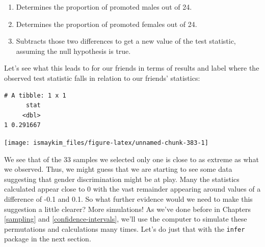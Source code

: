 \documentclass[12pt, krantz2,]{krantz}
\makeatletter
\newenvironment{Shaded}{\begin{snugshade}}{\end{snugshade}}
\newcommand{\DataTypeTok}[1]{\textcolor[rgb]{0.27,0.27,0.27}{#1}}
\newcommand{\KeywordTok}[1]{\textcolor[rgb]{0.27,0.27,0.27}{\textbf{#1}}}
\newcommand{\NormalTok}[1]{#1}
\newcommand{\OperatorTok}[1]{\textcolor[rgb]{0.43,0.43,0.43}{\textbf{#1}}}
\newcommand{\StringTok}[1]{\textcolor[rgb]{0.5,0.5,0.5}{#1}}
\providecommand{\tightlist}{%
  \setlength{\itemsep}{0pt}\setlength{\parskip}{0pt}}
\newenvironment{kframe}{%
\medskip{}
\setlength{\fboxsep}{.8em}
 \def\at@end@of@kframe{}%
 \ifinner\ifhmode%
  \def\at@end@of@kframe{\end{minipage}}%
  \begin{minipage}{\columnwidth}%
 \fi\fi%
 \def\FrameCommand##1{\hskip\@totalleftmargin \hskip-\fboxsep
 \colorbox{shadecolor}{##1}\hskip-\fboxsep
     \hskip-\linewidth \hskip-\@totalleftmargin \hskip\columnwidth}%
 \MakeFramed {\advance\hsize-\width
   \@totalleftmargin\z@ \linewidth\hsize
   \@setminipage}}%
 {\par\unskip\endMakeFramed%
 \at@end@of@kframe}
\renewenvironment{Shaded}{\begin{kframe}}{\end{kframe}}
\makeatother
\begin{document}
\begin{enumerate}
\def\labelenumi{\arabic{enumi}.}
\setcounter{enumi}{4}
\tightlist
\item
  Determines the proportion of promoted males out of 24.
\item
  Determines the proportion of promoted females out of 24.
\item
  Subtracts those two differences to get a new value of the test statistic, assuming the null hypothesis is true.
\end{enumerate}

Let's see what this leads to for our friends in terms of results and label where the observed test statistic falls in relation to our friends' statistics:

\begin{Shaded}
\end{Shaded}

\begin{verbatim}
# A tibble: 1 x 1
      stat
     <dbl>
1 0.291667
\end{verbatim}

\begin{center}\texttt{[image: ismaykim\_files/figure-latex/unnamed-chunk-383-1]} \end{center}

We see that of the 33 samples we selected only one is close to as extreme as what we observed. Thus, we might guess that we are starting to see some data suggesting that gender discrimination might be at play. Many the statistics calculated appear close to 0 with the vast remainder appearing around values of a difference of -0.1 and 0.1. So what further evidence would we need to make this suggestion a little clearer? More simulations! As we've done before in Chapters \ref{sampling} and \ref{confidence-intervals}, we'll use the computer to simulate these permutations and calculations many times. Let's do just that with the \texttt{infer} package in the next section.
\end{document}
